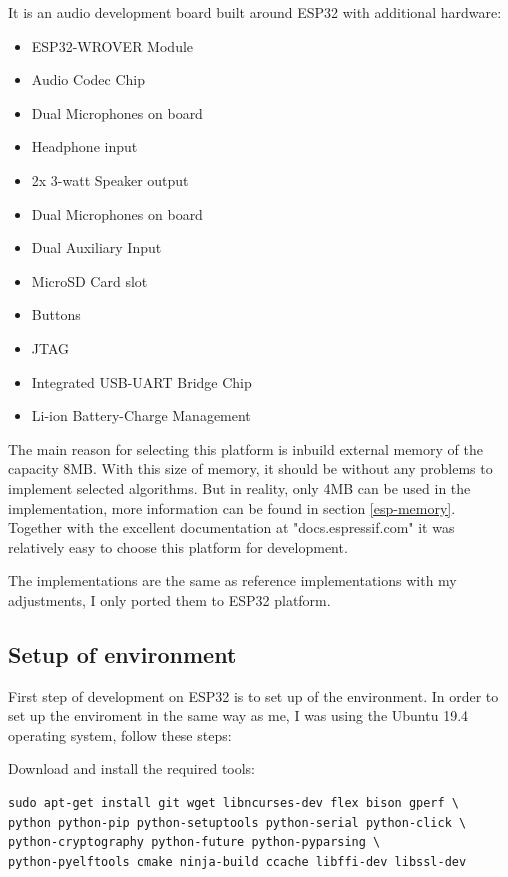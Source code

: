 \documentclass[thesis=M,english]{FITthesis}[2019/12/23]
\begin{document}
It is an audio development board built around ESP32 with additional hardware:
\begin{itemize}
\item	ESP32-WROVER Module
\item	Audio Codec Chip
\item	Dual Microphones on board
\item	Headphone input
\item	2x 3-watt Speaker output
\item	Dual Microphones on board
\item	Dual Auxiliary Input
\item	MicroSD Card slot
\item	Buttons
\item	JTAG
\item	Integrated USB-UART Bridge Chip
\item	Li-ion Battery-Charge Management
\end{itemize}

The main reason for selecting this platform is inbuild external memory of the capacity 8MB. With this size of memory, it should be without any problems to implement selected algorithms. But in reality, only 4MB can be used in the implementation, more information can be found in section \ref{esp-memory}. Together with the excellent documentation at "docs.espressif.com" it was relatively easy to choose this platform for development.

\bigskip
\noindent
The implementations are the same as reference implementations with my adjustments, I only ported them to ESP32 platform.

\subsection{Setup of environment}
First step of development on ESP32 is to set up of the environment. In order to set up the enviroment in the same way as me, I was using the Ubuntu 19.4 operating system, follow these steps:

\bigskip
\noindent
Download and install the required tools:
\begin{lstlisting}[frame=single]
sudo apt-get install git wget libncurses-dev flex bison gperf \
python python-pip python-setuptools python-serial python-click \
python-cryptography python-future python-pyparsing \
python-pyelftools cmake ninja-build ccache libffi-dev libssl-dev
\end{lstlisting}
\end{document}
